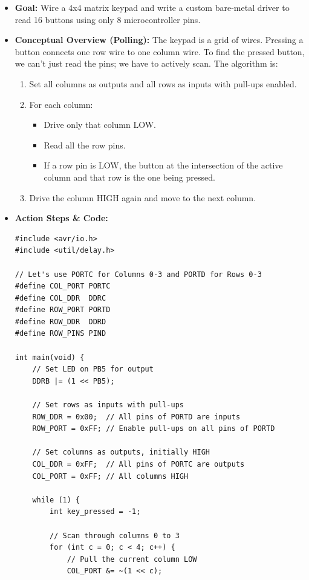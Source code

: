 \documentclass[11pt,a4paper]{article}
\begin{document}
\begin{itemize}
    \item \textbf{Goal:} Wire a 4x4 matrix keypad and write a custom bare-metal driver to read 16 buttons using only 8 microcontroller pins.
    \item \textbf{Conceptual Overview (Polling):} The keypad is a grid of wires. Pressing a button connects one row wire to one column wire. To find the pressed button, we can't just read the pins; we have to actively scan. The algorithm is:
    \begin{enumerate}
        \item Set all columns as outputs and all rows as inputs with pull-ups enabled.
        \item For each column:
        \begin{itemize}
            \item Drive only that column LOW.
            \item Read all the row pins.
            \item If a row pin is LOW, the button at the intersection of the active column and that row is the one being pressed.
        \end{itemize}
        \item Drive the column HIGH again and move to the next column.
    \end{enumerate}
    \item \textbf{Action Steps \& Code:}
\begin{lstlisting}[caption={Code for Module 6.2: Polling Keypad Scanner}]
#include <avr/io.h>
#include <util/delay.h>

// Let's use PORTC for Columns 0-3 and PORTD for Rows 0-3
#define COL_PORT PORTC
#define COL_DDR  DDRC
#define ROW_PORT PORTD
#define ROW_DDR  DDRD
#define ROW_PINS PIND

int main(void) {
    // Set LED on PB5 for output
    DDRB |= (1 << PB5);

    // Set rows as inputs with pull-ups
    ROW_DDR = 0x00;  // All pins of PORTD are inputs
    ROW_PORT = 0xFF; // Enable pull-ups on all pins of PORTD

    // Set columns as outputs, initially HIGH
    COL_DDR = 0xFF;  // All pins of PORTC are outputs
    COL_PORT = 0xFF; // All columns HIGH

    while (1) {
        int key_pressed = -1;

        // Scan through columns 0 to 3
        for (int c = 0; c < 4; c++) {
            // Pull the current column LOW
            COL_PORT &= ~(1 << c);


\end{lstlisting}
\end{itemize}
\end{document}
